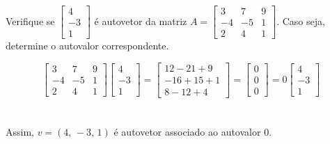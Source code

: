 \item Verifique se 
$\begin{bmatrix}
	4 \\ -3 \\ 1
\end{bmatrix}
$
é autovetor da matriz
$ A = 
\begin{bmatrix}
	3  &  7 & 9 \\
	-4 & -5 & 1 \\
	2  &  4 & 1
\end{bmatrix}
$.
Caso seja, determine o autovalor correspondente.
\pagebreak
\solucao

$$
\begin{bmatrix}
	3  &  7 & 9 \\
	-4 & -5 & 1 \\
	2  &  4 & 1
\end{bmatrix}
\begin{bmatrix}
	4 \\ -3 \\ 1
\end{bmatrix}
=
\begin{bmatrix}
  	12 - 21 + 9 \\ 
	-16 + 15 + 1 \\ 
	 8 - 12 + 4
\end{bmatrix}
=
\begin{bmatrix}
	0 \\ 0 \\ 0
\end{bmatrix}
=
0
\begin{bmatrix}
	4 \\ -3 \\ 1
\end{bmatrix}
$$
\\ \\
Assim, $v = (4, \, -3, \, 1)$ é autovetor associado
ao autovalor 0.